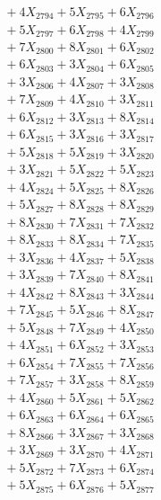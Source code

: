 \documentclass[a4paper,10pt]{article}
\begin{document}
{\begin{align}
&\;  + 4 X_{2794} + 5 X_{2795} + 6 X_{2796} \\[0.3ex]
&\;  + 5 X_{2797} + 6 X_{2798} + 4 X_{2799} \\[0.5ex]\allowbreak
&\;  + 7 X_{2800} + 8 X_{2801} + 6 X_{2802} \\[0.3ex]
&\;  + 6 X_{2803} + 3 X_{2804} + 6 X_{2805} \\[0.3ex]
&\;  + 3 X_{2806} + 4 X_{2807} + 3 X_{2808} \\[0.3ex]
&\;  + 7 X_{2809} + 4 X_{2810} + 3 X_{2811} \\[0.3ex]
&\;  + 6 X_{2812} + 3 X_{2813} + 8 X_{2814} \\[0.3ex]
&\;  + 6 X_{2815} + 3 X_{2816} + 3 X_{2817} \\[0.3ex]
&\;  + 5 X_{2818} + 5 X_{2819} + 3 X_{2820} \\[0.3ex]
&\;  + 3 X_{2821} + 5 X_{2822} + 5 X_{2823} \\[0.3ex]
&\;  + 4 X_{2824} + 5 X_{2825} + 8 X_{2826} \\[0.3ex]
&\;  + 5 X_{2827} + 8 X_{2828} + 8 X_{2829} \\[0.5ex]\allowbreak
&\;  + 8 X_{2830} + 7 X_{2831} + 7 X_{2832} \\[0.3ex]
&\;  + 8 X_{2833} + 8 X_{2834} + 7 X_{2835} \\[0.3ex]
&\;  + 3 X_{2836} + 4 X_{2837} + 5 X_{2838} \\[0.3ex]
&\;  + 3 X_{2839} + 7 X_{2840} + 8 X_{2841} \\[0.3ex]
&\;  + 4 X_{2842} + 8 X_{2843} + 3 X_{2844} \\[0.3ex]
&\;  + 7 X_{2845} + 5 X_{2846} + 8 X_{2847} \\[0.3ex]
&\;  + 5 X_{2848} + 7 X_{2849} + 4 X_{2850} \\[0.3ex]
&\;  + 4 X_{2851} + 6 X_{2852} + 3 X_{2853} \\[0.3ex]
&\;  + 6 X_{2854} + 7 X_{2855} + 7 X_{2856} \\[0.3ex]
&\;  + 7 X_{2857} + 3 X_{2858} + 8 X_{2859} \\[0.5ex]\allowbreak
&\;  + 4 X_{2860} + 5 X_{2861} + 5 X_{2862} \\[0.3ex]
&\;  + 6 X_{2863} + 6 X_{2864} + 6 X_{2865} \\[0.3ex]
&\;  + 8 X_{2866} + 3 X_{2867} + 3 X_{2868} \\[0.3ex]
&\;  + 3 X_{2869} + 3 X_{2870} + 4 X_{2871} \\[0.3ex]
&\;  + 5 X_{2872} + 7 X_{2873} + 6 X_{2874} \\[0.3ex]
&\;  + 5 X_{2875} + 6 X_{2876} + 5 X_{2877} \\[0.3ex]

\end{align}}
\end{document}
